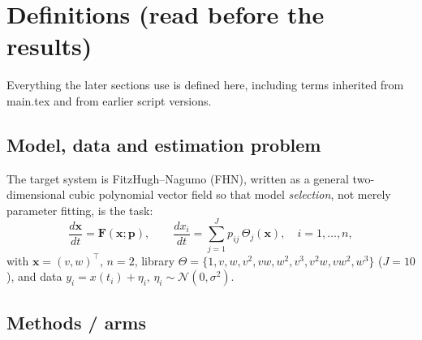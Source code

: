 \documentclass[10pt]{article}
\newcommand{\code}[1]{{\small\ttfamily\def\_{\char`\_\allowbreak}#1}}
\begin{document}
\section{Definitions (read before the results)}
\label{sec:defs}

Everything the later sections use is defined here, including terms inherited
from \code{main.tex} and from earlier script versions.

\subsection*{Model, data and estimation problem}

The target system is FitzHugh--Nagumo (FHN), written as a general two-dimensional cubic
polynomial vector field so that model \emph{selection}, not merely parameter fitting, is the task:
\begin{equation}
\frac{d\mathbf{x}}{dt} = \mathbf{F}(\mathbf{x};\mathbf{p}),
\qquad
\frac{dx_i}{dt} = \sum_{j=1}^{J} p_{ij}\,\Theta_j(\mathbf{x}),
\quad i=1,\dots,n,
\label{eq:model}
\end{equation}
with $\mathbf{x}=(v,w)^\top$, $n=2$, library $\Theta = \{1, v, w, v^2, vw, w^2, v^3, v^2w, vw^2, w^3\}$
($J=10$), and data $y_i = x(t_i) + \eta_i$, $\eta_i\sim\mathcal N(0,\sigma^2)$.

\subsection*{Methods / arms}
\end{document}
